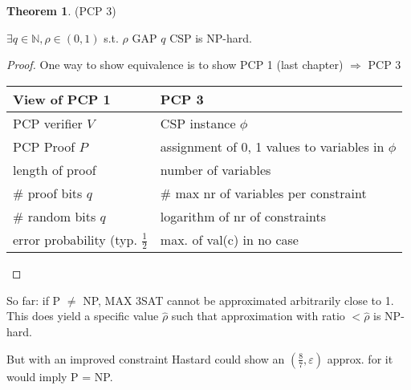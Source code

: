 \documentclass[11pt]{article}
\theoremstyle{definition}
\newtheorem{theorem}{Theorem}[section]
\theoremstyle{definition}
\begin{document}
\begin{theorem} (PCP 3)

$ \exists q \in \mathbb{N}, \rho \in (0, 1) $ s.t. $ \rho $ GAP $q$ CSP is NP-hard.

\end{theorem}

\begin{proof}

One way to show equivalence is to show PCP 1 (last chapter) $ \Rightarrow $ PCP 3 \newline

\begin{tabular}{l l}
View of PCP 1 & PCP 3 \\
\hline
PCP verifier $ V $ & CSP instance $ \phi $ \\

PCP Proof $ P $ & assignment of 0, 1 values to variables in $ \phi $ \\

length of proof & number of variables \\

\# proof bits $ q $ & \# max nr of variables per constraint \\

\# random bits $ q $ & logarithm of nr of constraints \\

error probability (typ. $ \frac{1}{2} $ & max. of val(c) in no case
\end{tabular}
\end{proof}

So far: if P $ \neq $ NP, MAX 3SAT cannot be approximated arbitrarily close to 1. This does yield a specific value $ \hat \rho $ such that approximation with ratio $ < \hat \rho $ is NP-hard.

But with an improved constraint Hastard could show an $ (\frac{8}{7}, \varepsilon)$ approx. for it would imply P = NP.
\end{document}
